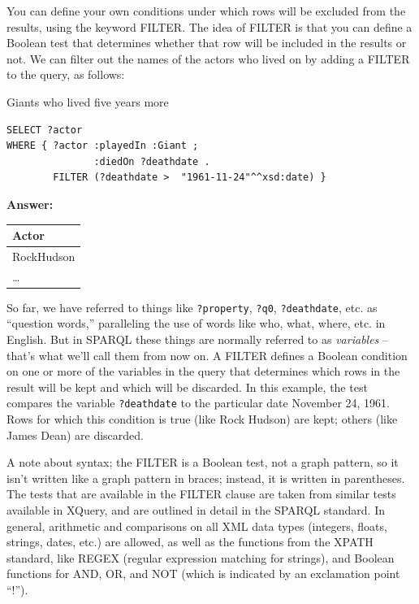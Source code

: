 You can define your own conditions under which rows will be excluded
from the results, using the keyword FILTER. The idea of FILTER is that
you can define a Boolean test that determines whether that row will be
included in the results or not. We can filter out the names of the
actors who lived on by adding a FILTER to the query, as follows:

\begin{query}Giants who lived five years more\end{query}

\begin{lstlisting}
SELECT ?actor
WHERE { ?actor :playedIn :Giant ;
               :diedOn ?deathdate . 
        FILTER (?deathdate >  "1961-11-24"^^xsd:date) }
\end{lstlisting}

\textbf{\textbf{Answer:}}

\begin{tabular}{|l|}
\hline
Actor\\
\hline
RockHudson\\
\ldots\\
\hline
\end{tabular}


So far, we have referred to things like \texttt{?property}, \texttt{?q0}, \texttt{?deathdate}, etc.
as ``question words,'' paralleling the use of words like who, what,
where, etc. in English. But in SPARQL these things are normally referred
to as \emph{variables} -- that's what we'll call them from now on. A
FILTER defines a Boolean condition on one or more of the variables in
the query that determines which rows in the result will be kept and
which will be discarded. In this example, the test compares the variable
\texttt{?deathdate} to the particular date November 24, 1961. Rows for which this
condition is true (like Rock Hudson) are kept; others (like James Dean)
are discarded.

A note about syntax; the FILTER is a Boolean test, not a graph pattern,
so it isn't written like a graph pattern in braces; instead, it is
written in parentheses. The tests that are available in the FILTER
clause are taken from similar tests available in XQuery, and are
outlined in detail in the SPARQL standard. \cite{Harris:13:SQL} In general, arithmetic and
comparisons on all XML data types (integers, floats, strings, dates,
etc.) are allowed, as well as the functions from the XPATH standard,  like REGEX (regular
expression matching for strings), and Boolean functions for AND, OR, and
NOT (which is indicated by an exclamation point ``!'').


